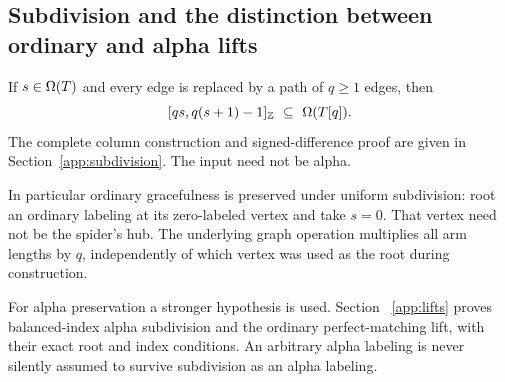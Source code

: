 \subsection{Subdivision and the distinction between ordinary and alpha lifts}

\begin{theorem}\label{common:offset-subdivision}
If $s\in\Omega(T)$ and every edge is replaced by a path of $q\ge1$
edges, then
\[
 \interval{qs}{q(s+1)-1}\ \subseteq\ \Om(T[q]).
\]
The complete column construction and signed-difference proof are given
in Section~\ref{app:subdivision}. The input need not be alpha.
\end{theorem}

In particular ordinary gracefulness is preserved under uniform
subdivision: root an ordinary labeling at its zero-labeled vertex and
take $s=0$. That vertex need not be the spider's hub. The underlying
graph operation multiplies all arm lengths by $q$, independently of
which vertex was used as the root during construction.

For alpha preservation a stronger hypothesis is used. Section~
\ref{app:lifts} proves balanced-index alpha subdivision and the ordinary
perfect-matching lift, with their exact root and index conditions.
An arbitrary alpha labeling is never silently assumed to survive
subdivision as an alpha labeling.
